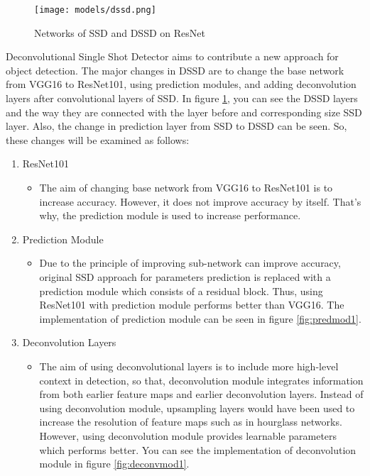 \documentclass{article}
\begin{document}
\setlength{\parindent}{6ex}

\begin{figure}
    \centering
    \texttt{[image: models/dssd.png]}
    \caption{Networks of SSD and DSSD on ResNet}
    \label{fig:dssd1}
\end{figure}

\indent

Deconvolutional Single Shot Detector aims to contribute a new approach for object 
detection. The major changes in DSSD are to change the base network from VGG16 to 
ResNet101, using prediction modules, and adding deconvolution layers after convolutional 
layers of SSD. In figure \ref{fig:dssd1}, you can see the DSSD layers and the way they are 
connected with the layer before and corresponding size SSD layer. Also, the change in 
prediction layer from SSD to DSSD can be seen. So, these changes will be examined as follows: 
\begin{enumerate}
    \item ResNet101
    \begin{itemize}
        \item The aim of changing base network from VGG16 to ResNet101 is to 
increase accuracy. However, it does not improve accuracy by itself. That's why, 
the prediction module is used to increase performance.
    \end{itemize}
    \item Prediction Module
    \begin{itemize}
        \item Due to the principle of improving sub-network can improve accuracy, 
original SSD approach for parameters prediction is replaced with a prediction module which 
consists of a residual block. Thus, using ResNet101 with prediction module performs 
better than VGG16. The implementation of prediction module can be seen in figure 
\ref{fig:predmod1}.
    \end{itemize}
    \item Deconvolution Layers
    \begin{itemize}
        \item The aim of using deconvolutional layers is to include more high-level 
context in detection, so that, deconvolution module integrates information from both 
earlier feature maps and earlier deconvolution layers. Instead of using deconvolution 
module, upsampling layers would have been used to increase the resolution of feature 
maps such as in hourglass networks. However, using deconvolution module provides 
learnable parameters which performs better. You can see the implementation of 
deconvolution module in figure \ref{fig:deconvmod1}.
    \end{itemize}
\end{enumerate}
\end{document}
